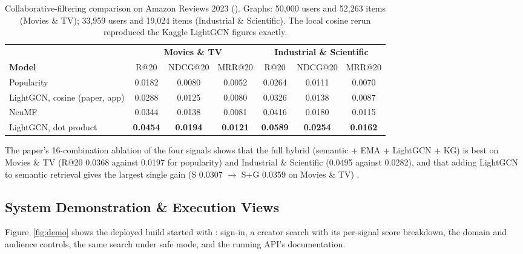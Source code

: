 \documentclass[11pt, a4paper]{article}
\newcommand{\mvDotR}{\textbf{0.0454}}
\newcommand{\mvDotN}{\textbf{0.0194}}
\newcommand{\mvDotM}{\textbf{0.0121}}
\begin{document}
\begin{table}[H]
    \centering
    \footnotesize
    \renewcommand{\arraystretch}{1.2}
    \begin{tabular}{|l|ccc|ccc|}
        \hline
        & \multicolumn{3}{c|}{\textbf{Movies \& TV}} & \multicolumn{3}{c|}{\textbf{Industrial \& Scientific}} \\
        \textbf{Model} & R@20 & NDCG@20 & MRR@20 & R@20 & NDCG@20 & MRR@20 \\
        \hline
        Popularity & 0.0182 & 0.0080 & 0.0052 & 0.0264 & 0.0111 & 0.0070 \\
        LightGCN, cosine (paper, app) & 0.0288 & 0.0125 & 0.0080 & 0.0326 & 0.0138 & 0.0087 \\
        NeuMF \cite{he2017ncf} & 0.0344 & 0.0138 & 0.0081 & 0.0416 & 0.0180 & 0.0115 \\
        LightGCN, dot product & \mvDotR & \mvDotN & \mvDotM & \textbf{0.0589} & \textbf{0.0254} & \textbf{0.0162} \\
        \hline
    \end{tabular}
    \caption{Collaborative-filtering comparison on Amazon Reviews 2023 (\protect{}). Graphs: 50,000 users and 52,263 items (Movies \& TV); 33,959 users and 19,024 items (Industrial \& Scientific). The local cosine rerun reproduced the Kaggle LightGCN figures exactly.}
    \label{tab:cf}
\end{table}

\noindent The paper's 16-combination ablation of the four signals shows that the full hybrid (semantic + EMA + LightGCN + KG) is best on Movies \& TV (R@20 0.0368 against 0.0197 for popularity) and Industrial \& Scientific (0.0495 against 0.0282), and that adding LightGCN to semantic retrieval gives the largest single gain (S 0.0307 $\rightarrow$ S+G 0.0359 on Movies \& TV) \cite{ak2026crossmedia}.

\subsection{System Demonstration \& Execution Views}
\noindent Figure~\ref{fig:demo} shows the deployed build started with : sign-in, a creator search with its per-signal score breakdown, the domain and audience controls, the same search under safe mode, and the running API's documentation.
\end{document}
